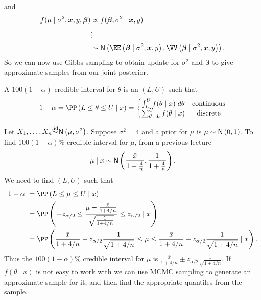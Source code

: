 and
\begin{align*}
    f ( \mu \mid \sigma^2 , \bm{x} , y, \bm{\beta})
     & \propto f (\bm{\beta}, \sigma^2 \mid \bm{x} , y)                                                                                             \\
     & \vdots                                                                                                                                       \\
     & \sim \Nor \left( \EE \left( \bm{\beta} \mid \sigma^2 , \bm{x} , y \right), \VV \left( \bm{\beta} \mid \sigma^2 , \bm{x} , y \right) \right).
\end{align*}
So we can now use Gibbs sampling to obtain update for $\sigma^2$ and $\bm{\beta}$ to give approximate samples from our joint posterior.
\begin{defe} \label{defe: bci}
    A $100 (1 - \alpha)$ credible interval for $\theta$ is an $(L,U)$ such that
    \[
        1 - \alpha = \PP \left( L \leq \theta \leq U \mid x \right) =
        \left\{ \begin{matrix}
            \int_L^U f(\theta \mid x) \; d \theta  & \text{continuous} \\
            \sum_{\theta = L}^{U} f(\theta \mid x) & \text{discrete}
        \end{matrix}
        \right.
    \]
\end{defe}

\begin{exam}
    Let $X_1 , \ldots , X_n {\overset{\text{iid}}{\sim}} {\sf N} \left( \mu , \sigma^2 \right)$. Suppose $\sigma^2 = 4$ and a prior for $\mu$ is $\mu \sim {\sf N} \left( 0,1 \right)$. To find $100 (1 - \alpha) \%$ credible interval for $\mu$, from a previous lecture
    \[
        \mu \mid x \sim {\sf N} \left( \frac{\bar{x}}{1 + \frac{4}{n}}, \frac{1}{1 + \frac{4}{n}} \right).
    \]
    We need to find $(L,U)$ such that
    \begin{align*}
        1 - \alpha \
         & = \PP\left( L \leq \mu \leq U \mid x \right)                                                                                                                             \\
         & = \PP\left( -z_{\alpha/2} \leq \frac{\mu - \frac{\bar{x}}{1 + 4/n}}{\sqrt{\frac{1}{1+4/n}}} \leq z_{\alpha/2}  \mid x \right)                                            \\
         & = \PP\left( \frac{\bar{x}}{1 + 4/n} -z_{\alpha/2} \frac{1}{\sqrt{1 + 4/n}} \leq \mu \leq \frac{\bar{x}}{1 + 4/n} +z_{\alpha/2} \frac{1}{\sqrt{1 + 4/n}}  \mid x \right).
    \end{align*}
    Thus the $100 (1 - \alpha) \%$ credible interval for $\mu$ is $\frac{\bar{x}}{1 + 4/n} \pm z_{\alpha/2} \frac{1}{\sqrt{1 + 4/n}}$. If $f(\theta \mid x)$ is not easy to work with we can use MCMC sampling to generate an approximate sample for it, and then find the appropriate quantiles from the sample.
\end{exam}

